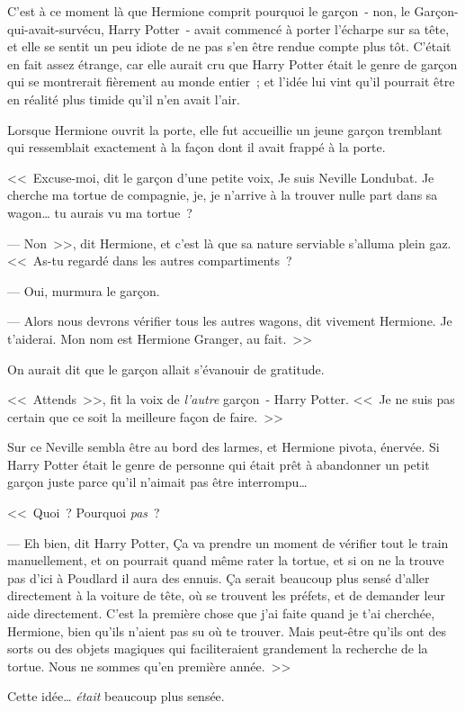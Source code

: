 C'est à ce moment là que Hermione comprit pourquoi le garçon~- non, le Garçon-qui-avait-survécu, Harry Potter~- avait commencé à porter l'écharpe sur sa tête, et elle se sentit un peu idiote de ne pas s'en être rendue compte plus tôt. C'était en fait assez étrange, car elle aurait cru que Harry Potter était le genre de garçon qui se montrerait fièrement au monde entier~; et l'idée lui vint qu'il pourrait être en réalité plus timide qu'il n'en avait l'air.

Lorsque Hermione ouvrit la porte, elle fut accueillie un jeune garçon tremblant qui ressemblait exactement à la façon dont il avait frappé à la porte.

<<~Excuse-moi, dit le garçon d'une petite voix, Je suis Neville Londubat. Je cherche ma tortue de compagnie, je, je n'arrive à la trouver nulle part dans sa wagon… tu aurais vu ma tortue~?

--- Non~>>, dit Hermione, et c'est là que sa nature serviable s'alluma plein gaz. <<~As-tu regardé dans les autres compartiments~?

--- Oui, murmura le garçon.

--- Alors nous devrons vérifier tous les autres wagons, dit vivement Hermione. Je t'aiderai. Mon nom est Hermione Granger, au fait.~>>

On aurait dit que le garçon allait s'évanouir de gratitude.

<<~Attends~>>, fit la voix de \emph{l'autre} garçon~- Harry Potter. <<~Je ne suis pas certain que ce soit la meilleure façon de faire.~>>

Sur ce Neville sembla être au bord des larmes, et Hermione pivota, énervée. Si Harry Potter était le genre de personne qui était prêt à abandonner un petit garçon juste parce qu'il n'aimait pas être interrompu…

<<~Quoi~? Pourquoi \emph{pas}~?

--- Eh bien, dit Harry Potter, Ça va prendre un moment de vérifier tout le train manuellement, et on pourrait quand même rater la tortue, et si on ne la trouve pas d'ici à Poudlard il aura des ennuis. Ça serait beaucoup plus sensé d'aller directement à la voiture de tête, où se trouvent les préfets, et de demander leur aide directement. C'est la première chose que j'ai faite quand je t'ai cherchée, Hermione, bien qu'ils n'aient pas su où te trouver. Mais peut-être qu'ils ont des sorts ou des objets magiques qui faciliteraient grandement la recherche de la tortue. Nous ne sommes qu'en première année.~>>

Cette idée… \emph{était} beaucoup plus sensée.

